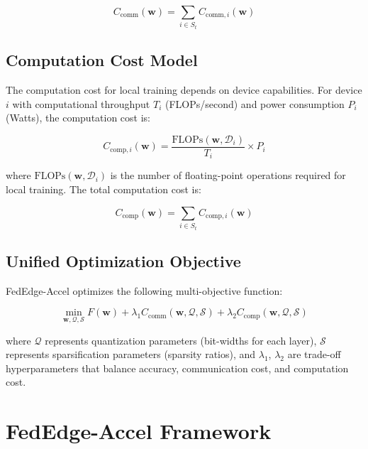 \documentclass[journal]{IEEEtran}
\begin{document}
\begin{equation}
C_{\text{comm}}(\mathbf{w}) = \sum_{i \in S_t} C_{\text{comm},i}(\mathbf{w})
\label{eq:total_comm_cost}
\end{equation}

\subsection{Computation Cost Model}

The computation cost for local training depends on device capabilities. For device $i$ with computational throughput $T_i$ (FLOPs/second) and power consumption $P_i$ (Watts), the computation cost is:

\begin{equation}
C_{\text{comp},i}(\mathbf{w}) = \frac{\text{FLOPs}(\mathbf{w}, \mathcal{D}_i)}{T_i} \times P_i
\label{eq:comp_cost}
\end{equation}

where $\text{FLOPs}(\mathbf{w}, \mathcal{D}_i)$ is the number of floating-point operations required for local training. The total computation cost is:

\begin{equation}
C_{\text{comp}}(\mathbf{w}) = \sum_{i \in S_t} C_{\text{comp},i}(\mathbf{w})
\label{eq:total_comp_cost}
\end{equation}

\subsection{Unified Optimization Objective}

FedEdge-Accel optimizes the following multi-objective function:

\begin{equation}
\min_{\mathbf{w}, \mathcal{Q}, \mathcal{S}} F(\mathbf{w}) + \lambda_1 C_{\text{comm}}(\mathbf{w}, \mathcal{Q}, \mathcal{S}) + \lambda_2 C_{\text{comp}}(\mathbf{w}, \mathcal{Q}, \mathcal{S})
\label{eq:unified_objective}
\end{equation}

where $\mathcal{Q}$ represents quantization parameters (bit-widths for each layer), $\mathcal{S}$ represents sparsification parameters (sparsity ratios), and $\lambda_1$, $\lambda_2$ are trade-off hyperparameters that balance accuracy, communication cost, and computation cost.

\section{FedEdge-Accel Framework}
\label{sec:framework}
\end{document}
